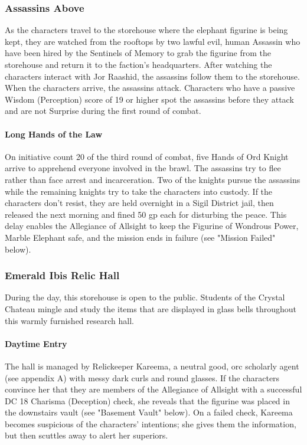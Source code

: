 \documentclass[10pt,a4paper,twoside,bg=print,twocolumn,openany,nodeprecatedcode]{dndbook}
\begin{document}
\subsubsection{Assassins Above}
As the characters travel to the storehouse where the elephant figurine is being kept, they are watched from the rooftops by two lawful evil, human Assassin who have been hired by the Sentinels of Memory to grab the figurine from the storehouse and return it to the faction's headquarters. After watching the characters interact with Jor Raashid, the assassins follow them to the storehouse. When the characters arrive, the assassins attack. Characters who have a passive Wisdom (Perception) score of 19 or higher spot the assassins before they attack and are not Surprise during the first round of combat.

\paragraph{Long Hands of the Law}
On initiative count 20 of the third round of combat, five Hands of Ord Knight arrive to apprehend everyone involved in the brawl. The assassins try to flee rather than face arrest and incarceration. Two of the knights pursue the assassins while the remaining knights try to take the characters into custody. If the characters don't resist, they are held overnight in a Sigil District jail, then released the next morning and fined 50 gp each for disturbing the peace. This delay enables the Allegiance of Allsight to keep the Figurine of Wondrous Power, Marble Elephant safe, and the mission ends in failure (see "Mission Failed" below).

\subsubsection{Emerald Ibis Relic Hall}
During the day, this storehouse is open to the public. Students of the Crystal Chateau mingle and study the items that are displayed in glass bells throughout this warmly furnished research hall.

\paragraph{Daytime Entry}
The hall is managed by Relickeeper Kareema, a neutral good, orc scholarly agent (see appendix A) with messy dark curls and round glasses. If the characters convince her that they are members of the Allegiance of Allsight with a successful DC 18 Charisma (Deception) check, she reveals that the figurine was placed in the downstairs vault (see "Basement Vault" below). On a failed check, Kareema becomes suspicious of the characters' intentions; she gives them the information, but then scuttles away to alert her superiors.
\end{document}
